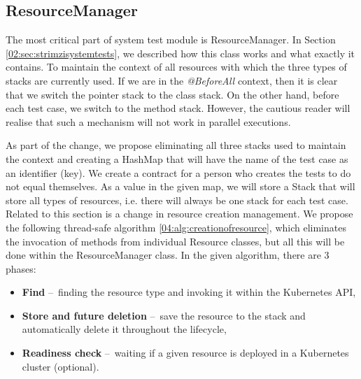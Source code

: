 \subsection{ResourceManager}

The most critical part of system test module is ResourceManager.
In Section \ref {02:sec:strimzisystemtests}, we described how this class works and what exactly it contains.
To maintain the context of all resources with which the three types of stacks are currently used.
If we are in the \emph{@BeforeAll} context, then it is clear that we switch the pointer stack to the class stack.
On the other hand, before each test case, we switch to the method stack.
However, the cautious reader will realise that such a mechanism will not work in parallel executions.

As part of the change, we propose eliminating all three stacks used to maintain the context and creating a HashMap that will have the name of the test case as an identifier (key).
We create a contract for a person who creates the tests to do not equal themselves.
As a value in the given map, we will store a Stack that will store all types of resources, i.e. there will always be one stack for each test case.
Related to this section is a change in resource creation management.
We propose the following thread-safe algorithm \ref{04:alg:creationofresource}, which eliminates the invocation of methods from individual Resource classes, but all this will be done within the ResourceManager class.
In the given algorithm, there are 3 phases:

\begin{itemize}[itemsep=1mm, parsep=0pt]
    \item \textbf{Find} \---\ finding the resource type and invoking it within the Kubernetes API,
    \item \textbf {Store and future deletion} \---\ save the resource to the stack and automatically delete it throughout the lifecycle,
    \item \textbf {Readiness check} \---\ waiting if a given resource is deployed in a Kubernetes cluster (optional).
\end{itemize}


